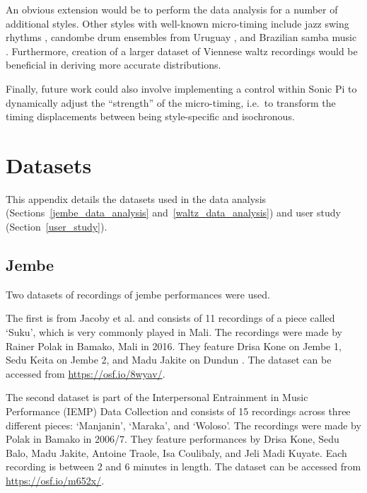 \documentclass[12pt,twoside,openright]{report}
\begin{document}
An obvious extension would be to perform the data analysis for a number of
additional styles. Other styles with well-known micro-timing include jazz swing
rhythms \cite{dittmar2018}, candombe drum ensembles from Uruguay \cite{jure2016,fuentes2019}, and Brazilian samba music \cite{naveda2011,fuentes2019}. Furthermore,
creation of a larger dataset of Viennese waltz recordings would be beneficial in
deriving more accurate distributions.

Finally, future work could also involve implementing a control within Sonic Pi
to dynamically adjust the ``strength'' of the micro-timing, i.e.\ to transform the
timing displacements between being style-specific and isochronous.





\printbibliography[heading=bibintoc]





\appendix





\chapter{Datasets} \label{appendix_datasets}

This appendix details the datasets used in the data analysis (Sections~\ref{jembe_data_analysis} and~\ref{waltz_data_analysis}) and user study (Section~\ref{user_study}).



\section*{Jembe} \label{appendix_datasets_jembe}

Two datasets of recordings of jembe performances were used.

The first is from Jacoby et al. \cite{jacoby2021} and consists of 11 recordings of a piece called `Suku', which is very commonly played in Mali. The recordings were made by Rainer Polak in Bamako, Mali in 2016. They feature Drisa Kone on Jembe 1, Sedu Keita on Jembe 2, and Madu Jakite on Dundun \cite{jacoby2021supp}. The dataset can be accessed from \url{https://osf.io/8wyav/}.

The second dataset is part of the Interpersonal Entrainment in Music Performance (IEMP)
Data Collection \cite{polak2020,clayton2021} and consists of 15 recordings across three different pieces: `Manjanin', `Maraka', and `Woloso'. The recordings were made by Polak in Bamako in 2006/7. They feature performances by Drisa Kone, Sedu Balo, Madu Jakite, Antoine Traole, Isa Coulibaly, and Jeli Madi Kuyate. Each recording is between 2 and 6 minutes in length. The dataset can be accessed from \url{https://osf.io/m652x/}.
\end{document}
